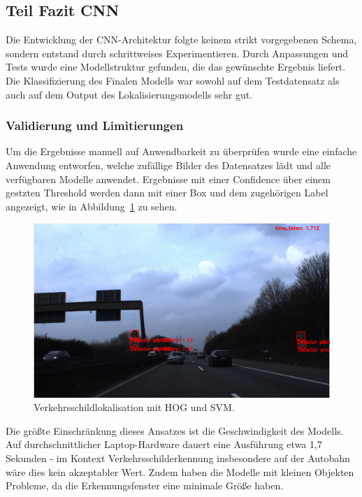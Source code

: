 \documentclass[runningheads]{llncs}
\begin{document}
\subsection{Teil Fazit CNN}
Die Entwicklung der CNN-Architektur folgte keinem strikt vorgegebenen Schema, sondern entstand durch schrittweises Experimentieren.
Durch Anpassungen und Tests wurde eine Modellstruktur gefunden, die das gewünschte Ergebnis liefert. Die Klassifizierung des
Finalen Modells war sowohl auf dem Testdatensatz als auch auf dem Output des Lokalisierungsmodells sehr gut.

\subsubsection{Validierung und Limitierungen}
Um die Ergebnisse manuell auf Anwendbarkeit zu überprüfen wurde eine einfache Anwendung entworfen, welche zufällige Bilder des Datensatzes lädt und alle verfügbaren Modelle anwendet. Ergebnisse mit einer Confidence über einem gestzten Threshold werden dann mit einer Box und dem zugehörigen Label angezeigt, wie in Abbildung~\ref{fig2} zu sehen.

\begin{figure}[H]
    \centering
    \includegraphics[width=1\textwidth]{images/example_prediction.png}
    \caption{Verkehrsschildlokalisation mit HOG und SVM.}
    \label{fig2}
\end{figure}

Die größte Einschränkung dieses Ansatzes ist die Geschwindigkeit des Modells. Auf durchschnittlicher Laptop-Hardware dauert eine Ausführung etwa 1,7 Sekunden - im Kontext Verkehrsschilderkennung insbesondere auf der Autobahn wäre dies kein akzeptabler Wert. Zudem haben die Modelle mit kleinen Objekten Probleme, da die Erkennungsfenster eine minimale Größe haben.
\end{document}
